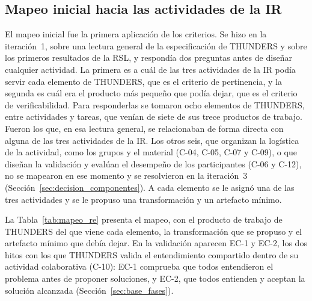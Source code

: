 \documentclass[12pt,letterpaper,oneside]{report}
\begin{document}
\subsection{Mapeo inicial hacia las actividades de la IR}
\label{sec:mapeo_inicial}
El mapeo inicial fue la primera aplicación de los criterios. Se hizo en la
iteración~1, sobre una lectura general de la especificación de THUNDERS y sobre
los primeros resultados de la RSL, y respondía dos preguntas antes de diseñar
cualquier actividad. La primera es a cuál de las tres actividades de la IR podía
servir cada elemento de THUNDERS, que es el criterio de pertinencia, y la
segunda es cuál era el producto más pequeño que podía dejar, que es el criterio
de verificabilidad. Para responderlas se tomaron ocho elementos de THUNDERS,
entre actividades y tareas, que venían de siete de sus trece productos de trabajo. Fueron
los que, en esa lectura general, se relacionaban de forma directa con alguna de
las tres actividades de la IR. Los otros seis, que organizan la logística de la
actividad, como los grupos y el material (C-04, C-05, C-07 y C-09), o que
diseñan la validación y evalúan el desempeño de los participantes (C-06 y C-12),
no se mapearon en ese momento y se resolvieron en la iteración~3
(Sección~\ref{sec:decision_componentes}). A cada elemento se le asignó una de
las tres actividades y se le propuso una transformación y un artefacto mínimo.

La Tabla~\ref{tab:mapeo_re} presenta el mapeo, con el producto de trabajo de THUNDERS del
que viene cada elemento, la transformación que se propuso y el artefacto mínimo
que debía dejar. En la validación aparecen EC-1 y EC-2, los dos hitos con los que
THUNDERS valida el entendimiento compartido dentro de su actividad colaborativa
(C-10): EC-1 comprueba que todos entendieron el problema antes de proponer
soluciones, y EC-2, que todos entienden y aceptan la solución alcanzada
(Sección~\ref{sec:base_fases}).
\end{document}
